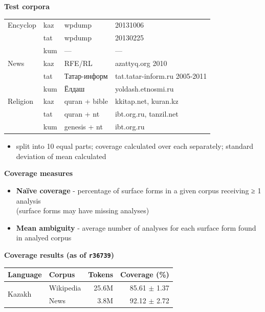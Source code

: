 \documentclass[a0paper,fontscale=0.3]{baposter}  %
\newcommand{\htwo}[1]{{\htwofont \textbf{\dotfill{}#1\dotfill{}}}}
\begin{document}
\begin{poster}
{			\htwo{Test corpora}
			\begin{tabular}{llll}
				\toprule
				Encyclop & kaz & wpdump & 20131006 \\
					& tat & wpdump & 20130225 \\
					& kum & — & — \\
				\midrule
				News & kaz & RFE/RL & azattyq.org 2010 \\
					& tat & Татар-информ & tat.tatar-inform.ru 2005-2011 \\
					& kum & Ёлдаш & yoldash.etnosmi.ru \\
				\midrule
				Religion & kaz & quran + bible & kkitap.net, kuran.kz \\
					& tat & quran + nt & ibt.org.ru, tanzil.net \\
					& kum & genesis + nt & ibt.org.ru \\
				\bottomrule
			\end{tabular}
			\begin{itemize}
				\item split into 10 equal parts; coverage calculated over each separately; standard deviation of mean calculated
			\end{itemize}
			\htwo{Coverage measures}
			\begin{itemize}
				\item \textbf{Naïve coverage} - percentage of surface forms in a given corpus receiving ≥ 1 analysis\\(surface forms may have missing analyses)
				\item \textbf{Mean ambiguity} - average number of analyses for each surface form found in analyed corpus
			\end{itemize}
			\htwo{Coverage results (as of \texttt{r36739})}\\
			\begin{tabular}{llrr}
				\toprule
				\textbf{Language} & \textbf{Corpus} & \textbf{Tokens} & \textbf{Coverage} (\%) \\
				\midrule
				\multirow{4}{*}{Kazakh} & Wikipedia & 25.6M & 85.61 $\pm$ 1.37 \\
					& News & 3.8M & 92.12 $\pm$ 2.72  \\

\end{tabular}}
\end{poster}
\end{document}
